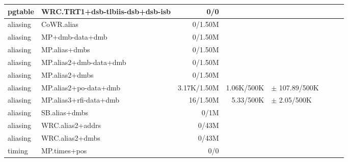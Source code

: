 \begin{tabular}{l l  | r r l | r r l}
\hline
   pgtable&WRC.TRT1+dsb-tlbiis-dsb+dsb-isb&0/0&&&\\
\hline
   aliasing&CoWR.alias&0/1.50M&&&\\
\hline
   aliasing&MP+dmb-data+dmb&0/1.50M&&&\\
\hline
   aliasing&MP.alias+dmbs&0/1.50M&&&\\
\hline
   aliasing&MP.alias2+dmb-data+dmb&0/1.50M&&&\\
\hline
   aliasing&MP.alias2+dmbs&0/1.50M&&&\\
\hline
   aliasing&MP.alias2+po-data+dmb&3.17K/1.50M&1.06K/500K&$\pm$ 107.89/500K&\\
\hline
   aliasing&MP.alias3+rfi-data+dmb&16/1.50M&5.33/500K&$\pm$ 2.05/500K&\\
\hline
   aliasing&SB.alias+dmbs&0/1M&&&\\
\hline
   aliasing&WRC.alias2+addrs&0/43M&&&\\
\hline
   aliasing&WRC.alias2+dmbs&0/43M&&&\\
\hline
   timing&MP.times+pos&0/0&&&\\
\hline
\hline
\end{tabular}
